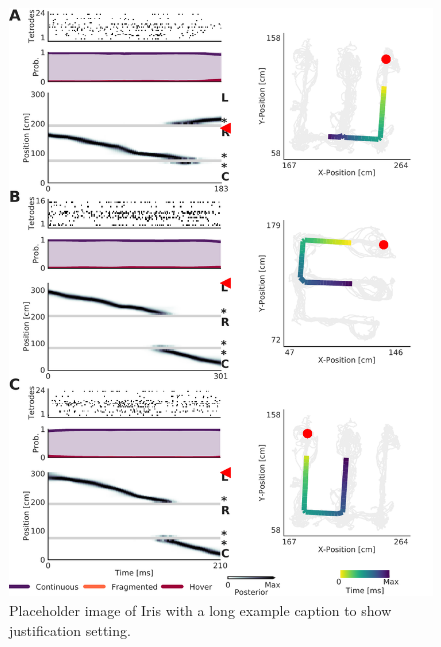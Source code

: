 \documentclass[times, twoside]{zHenriquesLab-StyleBioRxiv}
\begin{document}
\begin{figure}%
\centering
\includegraphics[width=0.80\linewidth]{figures/Figure2-supplemental2/Figure2_v2-supplemental2}
\caption{Placeholder image of Iris with a long example caption to show justification setting.}
\label{fig:Figure2-Figure supplement 2}
\end{figure}
\end{document}

